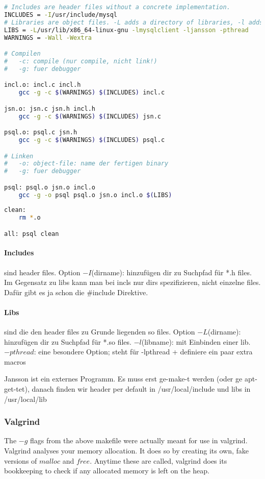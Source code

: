 \begin{lstlisting}[language=bash]
# Includes are header files without a concrete implementation.
INCLUDES = -I/usr/include/mysql
# Libraries are object files. -L adds a directory of libraries, -l adds a single library. 
LIBS = -L/usr/lib/x86_64-linux-gnu -lmysqlclient -ljansson -pthread
WARNINGS = -Wall -Wextra

# Compilen
#   -c: compile (nur compile, nicht link!)
#   -g: fuer debugger

incl.o: incl.c incl.h
	gcc -g -c $(WARNINGS) $(INCLUDES) incl.c

jsn.o: jsn.c jsn.h incl.h
	gcc -g -c $(WARNINGS) $(INCLUDES) jsn.c

psql.o: psql.c jsn.h
	gcc -g -c $(WARNINGS) $(INCLUDES) psql.c

# Linken
# 	-o: object-file: name der fertigen binary
# 	-g: fuer debugger

psql: psql.o jsn.o incl.o
	gcc -g -o psql psql.o jsn.o incl.o $(LIBS)
	
clean: 
    rm *.o

all: psql clean
\end{lstlisting}
 
\paragraph{Includes} sind header files.
Option $-I$(dirname): hinzufügen dir zu Suchpfad für *.h files.
Im Gegensatz zu libs kann man bei incls nur dirs spezifizieren, nicht einzelne files. Dafür gibt es ja schon die \#include Direktive.

\paragraph{Libs} sind die den header files zu Grunde liegenden so files.
Option $-L$(dirname): hinzufügen dir zu Suchpfad für *.so files.
 	$-l$(libname): mit Einbinden einer lib.
 	$-pthread$: eine besondere Option; steht für -lpthread + definiere ein paar extra macros

Jansson ist ein externes Programm. Es muss erst ge-make-t werden (oder ge apt-get-tet), danach finden wir header per default in /usr/local/include und libs in /usr/local/lib

\subsubsection{Valgrind}
The $-g$ flags from the above makefile were actually meant for use in valgrind. 
Valgrind analyses your memory allocation. It does so by creating its own, fake versions of $malloc$ and $free$. Anytime these are called, valgrind does its bookkeeping to check if any allocated memory is left on the heap.

